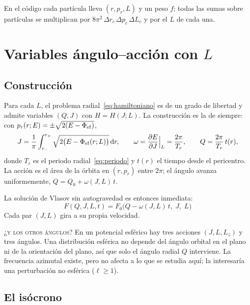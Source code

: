\documentclass[11pt,a4paper]{article}
\newcommand{\dd}{\mathrm{d}}
\begin{document}
En el código cada partícula lleva $(r,p_r,L)$ y un peso $f$; todas las sumas sobre
partículas se multiplican por $8\pi^2\,\Delta r_c\,\Delta p_c\,\Delta L_c$ y por el $L$
de cada una.

\section{Variables ángulo--acción con \texorpdfstring{$L$}{L}}
\label{sec:aa}

\subsection{Construcción}

Para cada $L$, el problema radial~\eqref{eq:hamiltoniano} es de un grado de libertad y
admite variables $(Q,J)$ con $H=H(J;L)$. La construcción es la de siempre: con
$p_r(r;E)=\pm\sqrt{2(E-\Phi_{\rm ef})}$,
\begin{equation}
  J=\frac{1}{\pi}\int_{r_-}^{r_+}\sqrt{2\big(E-\Phi_{\rm ef}(r;L)\big)}\,\dd r,
  \qquad
  \omega=\frac{\partial E}{\partial J}\Big|_L=\frac{2\pi}{T_r},
  \qquad
  Q=\frac{2\pi}{T_r}\,t(r),
  \label{eq:accion}
\end{equation}
donde $T_r$ es el periodo radial~\eqref{eq:periodo} y $t(r)$ el tiempo desde el
pericentro. La acción es el área de la órbita en $(r,p_r)$ entre $2\pi$; el ángulo
avanza uniformemente, $Q=Q_0+\omega(J,L)\,t$.

La solución de Vlasov sin autogravedad es entonces inmediata:
\begin{equation}
  \boxed{\;F(Q,J,L,t)=F_0\big(Q-\omega(J,L)\,t,\;J,\;L\big)\;}
  \label{eq:solucion}
\end{equation}
Cada par $(J,L)$ gira a su propia velocidad.

\begin{aviso}
\textsc{¿y los otros ángulos?} En un potencial esférico hay tres acciones $(J,L,L_z)$ y
tres ángulos. Una distribución esférica no depende del ángulo orbital en el plano ni de
la orientación del plano, así que solo el ángulo radial $Q$ interviene. La frecuencia
azimutal existe, pero no afecta a lo que se estudia aquí; la interesaría una perturbación
no esférica ($\ell\geq1$).
\end{aviso}

\subsection{El isócrono}
\end{document}
